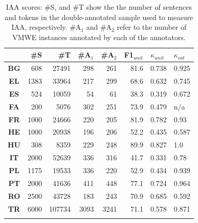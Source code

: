 \documentclass[output=paper,modfonts]{langscibook}
\begin{document}
\begin{table}
\centering
\begin{tabularx}{0.79\textwidth}{c@{\qquad}rrrrrll}
\lsptoprule
& \#S&\#T& \#A$_1$&\#A$_2$& F1$_{\textit{unit}}$ &$\kappa_{\textit{unit}}$&  $\kappa_{\textit{cat}}$\\\midrule
\textbf{BG}	&	608	&	27491	&	298	&	261	&	81.6	&	0.738	&	0.925	\\
\textbf{EL}	&	1383	&	33964	&	217	&	299	&	68.6	&	0.632	&	0.745	\\
\textbf{ES}	&	524	&	10059	&	54	&	61	&	38.3	&	0.319	&	0.672	\\
\textbf{FA}	&	200	&	5076	&	302	&	251	&	73.9	&	0.479	&	n/a	\\
\textbf{FR}	&	1000	&	24666	&	220	&	205	&	81.9	&	0.782	&	0.93	\\
\textbf{HE}	&	1000	&	20938	&	196	&	206	&	52.2	&	0.435	&	0.587	\\
\textbf{HU}	&	308	&	8359	&	229	&	248	&	89.9	&	0.827	&	1.0	\\
\textbf{IT}	&	2000	&	52639	&	336	&	316	&	41.7	&	0.331	&	0.78	\\
\textbf{PL}	&	1175	&	19533	&	336	&	220	&	52.9	&	0.434	&	0.939	\\
\textbf{PT}	&	2000	&	41636	&	411	&	448	&	77.1	&	0.724	&	0.964	\\
\textbf{RO}	&	2500	&	43728	&	183	&	243	&	70.9	&	0.685	&	0.592	\\
\textbf{TR}	&	6000	&	107734	&	3093	&	3241	&	71.1	&	0.578	&	0.871	\\
\lspbottomrule
\end{tabularx}
\caption{IAA scores: \#S, and \#T show the the number of sentences and tokens in the double-annotated sample used to measure IAA, respectively. \#A$_1$ and \#A$_2$ refer to the number of VMWE instances annotated by each of the annotators.  
}
\label{iaa-table}
\end{table}

\end{document}
